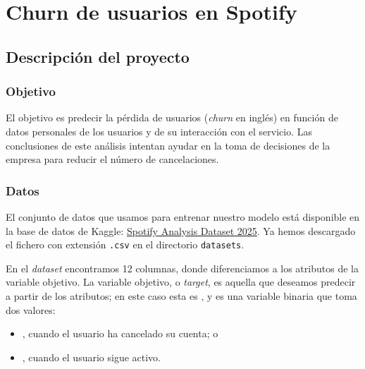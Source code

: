 \section{Churn de usuarios en Spotify}


\subsection{Descripción del proyecto}

\subsubsection{Objetivo}

El objetivo es predecir la pérdida de usuarios (\textit{churn} en inglés) en función de datos personales de los usuarios y de su interacción con el servicio. Las conclusiones de este análisis intentan ayudar en la toma de decisiones de la empresa para reducir el número de cancelaciones.


\subsubsection{Datos}

El conjunto de datos que usamos para entrenar nuestro modelo está disponible en la base de datos de Kaggle: \href{https://www.kaggle.com/datasets/nabihazahid/spotify-dataset-for-churn-analysis/data}{Spotify Analysis Dataset 2025}. 
Ya hemos descargado el fichero con extensión \texttt{.csv} en el directorio \texttt{datasets}.

En el \textit{dataset} encontramos 12 columnas, donde diferenciamos a los atributos de la variable objetivo. 
La variable objetivo, o \textit{target}, es aquella que deseamos predecir a partir de los atributos; 
en este caso esta es , y es una variable binaria que toma dos valores:
\begin{itemize}
    \item {}, cuando el usuario ha cancelado su cuenta; o
    \item {}, cuando el usuario sigue activo.
\end{itemize}

